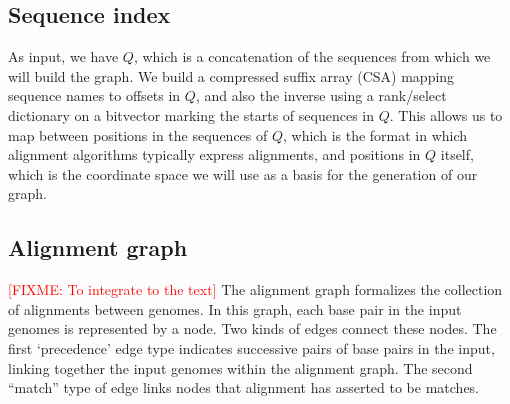 \documentclass{bioinfo}
\newcommand{\red}[1]{{\textcolor{Red}{#1}}}
\newcommand{\FIXME}[1]{\red{[FIXME: #1]}}
\begin{document}






\subsection{Sequence index}

As input, we have $Q$, which is a concatenation of the sequences from which we will build the graph.
We build a compressed suffix array (CSA) mapping sequence names to offsets in $Q$, and also the inverse using a rank/select dictionary on a bitvector marking the starts of sequences in $Q$.
This allows us to map between positions in the sequences of $Q$, which is the format in which alignment algorithms typically express alignments, and positions in $Q$ itself, which is the coordinate space we will use as a basis for the generation of our graph.


\subsection{Alignment graph}

\FIXME{To integrate to the text} The alignment graph formalizes the collection of alignments between genomes.
In this graph, each base pair in the input genomes is represented by a node.
Two kinds of edges connect these nodes.
The first `precedence' edge type indicates successive pairs of base pairs in the input,
linking together the input genomes within the alignment graph.
The second “match” type of edge links nodes that alignment has asserted to be matches.
\end{document}
